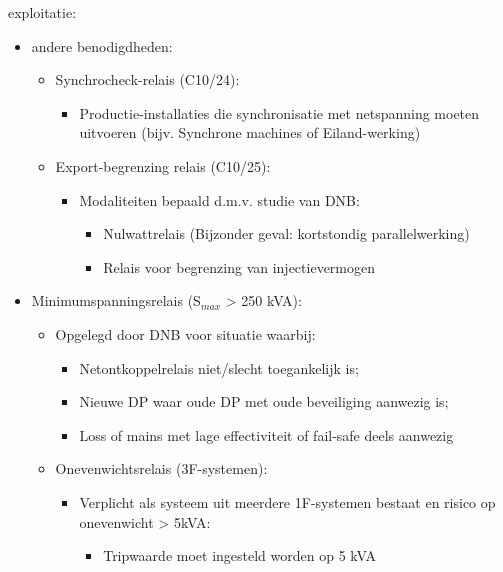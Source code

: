 \documentclass[12pt]{article}
\begin{document}
exploitatie:\begin{itemize}
    \item andere benodigdheden:\begin{itemize}
        \item Synchrocheck-relais (C10/24):\begin{itemize}
            \item Productie-installaties die synchronisatie met netspanning
            moeten uitvoeren (bijv. Synchrone machines of Eiland-werking)
        \end{itemize}
        \item Export-begrenzing relais (C10/25):\begin{itemize}
            \item Modaliteiten bepaald d.m.v. studie van DNB:\begin{itemize}
                \item  Nulwattrelais (Bijzonder geval: kortstondig parallelwerking)
                \item Relais voor begrenzing van injectievermogen                
            \end{itemize}
        \end{itemize}
    \end{itemize}
    \item Minimumspanningsrelais (S$_{max}$ > 250 kVA):\begin{itemize}
        \item Opgelegd door DNB voor situatie waarbij:\begin{itemize}
            \item Netontkoppelrelais niet/slecht toegankelijk is;
            \item Nieuwe DP waar oude DP met oude beveiliging aanwezig is;
            \item Loss of mains met lage effectiviteit of fail-safe deels aanwezig
        \end{itemize}
        \item Onevenwichtsrelais (3F-systemen):\begin{itemize}
            \item Verplicht als systeem uit meerdere 1F-systemen bestaat
            en risico op onevenwicht > 5kVA:\begin{itemize}
                \item Tripwaarde moet ingesteld worden op 5 kVA
            \end{itemize}
        \end{itemize}
    \end{itemize}
\end{itemize}
\end{document}
